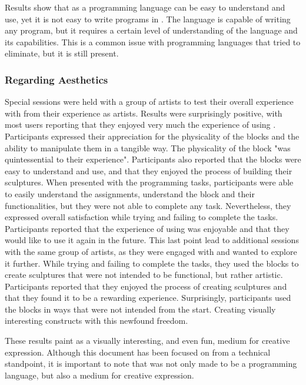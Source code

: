Results show that \sculpt as a programming language can be easy to understand and use, yet it is not easy to write programs in \sculpt.
The language is capable of writing any program, but it requires a certain level of understanding of the language and its capabilities.
This is a common issue with programming languages that \sculpt tried to eliminate, but it is still present.

\subsubsection{Regarding Aesthetics}
\label{sec:results:validation:aesthetics}
Special sessions were held with a group of artists to test their overall experience with \sculpt from their experience as artists.
Results were surprisingly positive, with most users reporting that they enjoyed very much the experience of using \sculpt.
Participants expressed their appreciation for the physicality of the blocks and the ability to manipulate them in a tangible way.
The physicality of the block "was quintessential to their experience".
Participants also reported that the blocks were easy to understand and use, and that they enjoyed the process of building their sculptures.
When presented with the programming tasks, participants were able to easily understand the assignments, understand the block and their functionalities, but they were not able to complete any task.
Nevertheless, they expressed overall satisfaction while trying and failing to complete the tasks.
Participants reported that the experience of using \sculpt was enjoyable and that they would like to use it again in the future.
This last point lead to additional sessions with the same group of artists, as they were engaged with \sculpt and wanted to explore it further.
While trying and failing to complete the tasks, they used the blocks to create sculptures that were not intended to be functional, but rather artistic.
Participants reported that they enjoyed the process of creating sculptures and that they found it to be a rewarding experience.
Surprisingly, participants used the blocks in ways that were not intended from the start. Creating visually interesting constructs with this newfound freedom.

These results paint \sculpt as a visually interesting, and even fun, medium for creative expression.
Although this document has been focused on \sculpt from a technical standpoint, it is important to note that \sculpt was not only made to be a programming language, but also a medium for creative expression.
\endinput